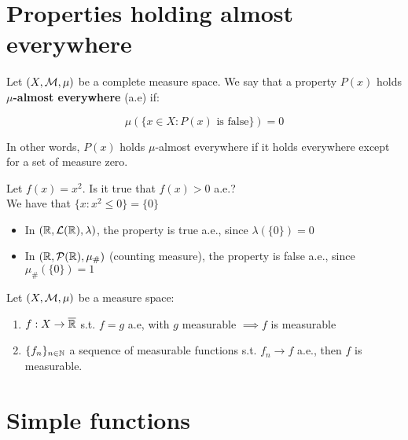 \section{Properties holding almost everywhere}

\begin{fdefinition}
    Let $(X, \mathcal{M}, \mu)$ be a complete measure space. 
    We say that a property $P(x)$ holds \textbf{$\mu$-almost everywhere}
    (a.e) if:
    
    $$\mu(\{x \in X: P(x) \text{ is false}\}) = 0$$

    In other words, $P(x)$ holds $\mu$-almost everywhere if it holds everywhere except
    for a set of measure zero.

\end{fdefinition}

\begin{example}
    Let $f(x) = x^2$. Is it true that $f(x) > 0$ a.e.?\\

    We have that $\{x: x^2 \leq 0\} = \{0\}$
    \vspace{1em}

    \begin{itemize}
        \item In $(\mathbb{R}, \mathcal{L}(\mathbb{R}), \lambda)$, the property is true a.e., since
        $\lambda(\{0\}) = 0$

        \item In $(\mathbb{R}, \mathcal{P}(\mathbb{R}), \mu_{\#})$ (counting measure), the property is false a.e.,
        since $\mu_{\#}(\{0\}) = 1$
    \end{itemize}
\end{example}

\begin{fproposition}
    Let $(X, \mathcal{M}, \mu)$ be a measure space:
    \vspace{1em}
    \begin{enumerate}
        \item $f: X \to \overline{\mathbb{R}}$ s.t. $f = g$ a.e, with $g$ measurable $\implies f$ is measurable
        \vspace{1em}
        \item $\{f_n\}_{n \in \mathbb{N}}$ a sequence of measurable functions s.t. $f_n \to f$ a.e., 
        then $f$ is measurable.
    \end{enumerate}
\end{fproposition}

\section{Simple functions}

